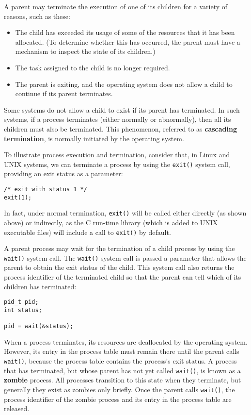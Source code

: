 A parent may terminate the execution of one of its children for a variety of reasons, such as these:
\begin{itemize}
    \item The child has exceeded its usage of some of the resources that it has been allocated. (To determine whether this has occurred, the parent must have a mechanism to inspect the state of its children.)
    \item The task assigned to the child is no longer required.
    \item The parent is exiting, and the operating system does not allow a child to continue if its parent terminates.
\end{itemize}
Some systems do not allow a child to exist if its parent has terminated. In such systems, if a process terminates (either normally or abnormally), then all its children must also be terminated. This phenomenon, referred to as \textbf{cascading termination}, is normally initiated by the operating system.

To illustrate process execution and termination, consider that, in Linux and UNIX systems, we can terminate a process by using the \texttt{exit()} system call, providing an exit status as a parameter:
\begin{verbatim}
/* exit with status 1 */
exit(1);
\end{verbatim}
In fact, under normal termination, \texttt{exit()} will be called either directly (as shown above) or indirectly, as the C run-time library (which is added to UNIX executable files) will include a call to \texttt{exit()} by default.

A parent process may wait for the termination of a child process by using the \texttt{wait()} system call. The \texttt{wait()} system call is passed a parameter that allows the parent to obtain the exit status of the child. This system call also returns the process identifier of the terminated child so that the parent can tell which of its children has terminated:
\begin{verbatim}
pid_t pid;
int status;

pid = wait(&status);
\end{verbatim}
When a process terminates, its resources are deallocated by the operating system. However, its entry in the process table must remain there until the parent calls \texttt{wait()}, because the process table contains the process's exit status. A process that has terminated, but whose parent has not yet called \texttt{wait()}, is known as a \textbf{zombie} process. All processes transition to this state when they terminate, but generally they exist as zombies only briefly. Once the parent calls \texttt{wait()}, the process identifier of the zombie process and its entry in the process table are released.

